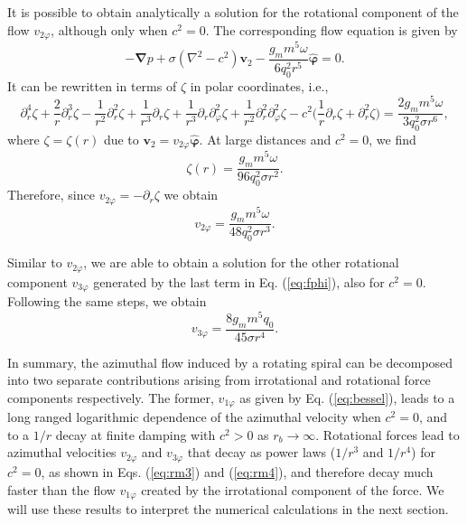 \documentclass[preprint,prx,floatfix]{revtex4-1}
\begin{document}
It is possible to obtain analytically a solution for the rotational component of the flow $v_{2\varphi}$, although only when $c^{2} = 0$. The corresponding flow equation is given by
\begin{equation}
-\bm{\nabla} p + \sigma(\nabla^2 -c^2)\mathbf{v}_2 - \frac{g_m m^5\omega}{6 q_0^2 r^5}\hat{\bm{\varphi}} = 0.
\end{equation}
It can be rewritten in terms of $\zeta$ in polar coordinates, i.e.,
\begin{equation}
\partial^4_r \zeta+\frac{2}{r}\partial^3_r\zeta
-\frac{1}{r^2}\partial^2_r\zeta + \frac{1}{r^3}\partial_r\zeta
+\frac{1}{r^3}\partial_r\partial_\varphi^2\zeta+\frac{1}{r^2}\partial^2_r\partial^2_\varphi\zeta
-c^2 \bigg(\frac{1}{r}\partial_r\zeta+\partial^2_r\zeta \bigg)
= \frac{2 g_m m^5\omega}{3q_0^2 \sigma r^6},
\end{equation}
where $\zeta = \zeta(r)$ due to $\mathbf{v}_2 = v_{2\varphi}\hat{\bm{\varphi}}$. At large distances and $c^{2} = 0$, we find
\begin{equation}
    \zeta(r) = \frac{g_m m^5\omega}{96 q_0^2 \sigma r^2}.
\end{equation}
Therefore, since $v_{2\varphi} = -\partial_r \zeta$ we obtain
\begin{equation}
    v_{2\varphi} = \frac{g_m m^5\omega}{48 q_0^2 \sigma r^3}.
    \label{eq:rm3}
\end{equation}

Similar to $v_{2\varphi}$, we are able to obtain a solution for the other rotational component $v_{3\varphi}$ generated by the last term in Eq. (\ref{eq:fphi}), also for $c^{2} = 0$. Following the same steps, we obtain
\begin{equation}
    v_{3\varphi} = \frac{8 g_m m^5q_0}{45 \sigma r^4}.
    \label{eq:rm4}
\end{equation}

In summary, the azimuthal flow induced by a rotating spiral can be decomposed into two separate contributions arising from irrotational and rotational force components respectively. The former, $v_{1\varphi}$ as given by Eq. (\ref{eq:bessel}), leads to a long ranged logarithmic dependence of the azimuthal velocity when $c^{2} = 0$, and to a $1/r$ decay at finite damping with $c^{2} > 0$ as $r_{b} \rightarrow \infty$. Rotational forces lead to azimuthal velocities $v_{2\varphi}$ and $v_{3\varphi}$ that decay as power laws ($1/r^{3}$ and $1/r^{4}$) for $c^2 = 0$, as shown in Eqs. (\ref{eq:rm3}) and (\ref{eq:rm4}), and therefore decay much faster than the flow $v_{1\varphi}$ created by the irrotational component of the force. We will use these results to interpret the numerical calculations in the next section.
\end{document}
